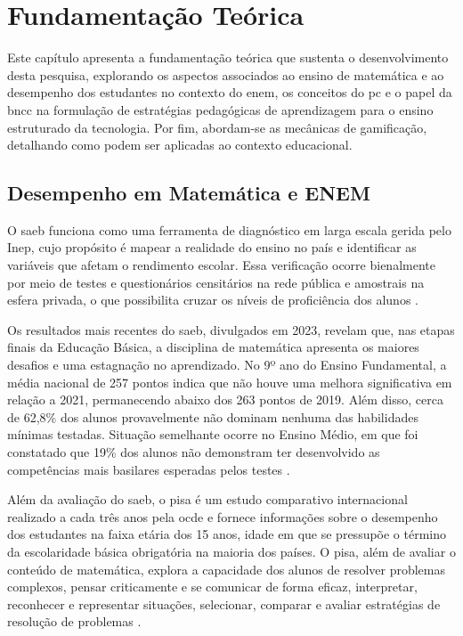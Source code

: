 
\setlength{\parskip}{0.3cm}

\chapter{Fundamentação Teórica}
\label{ch:fundamentacao}

Este capítulo apresenta a fundamentação teórica que sustenta o desenvolvimento
desta pesquisa, explorando os aspectos associados ao ensino de matemática e ao
desempenho dos estudantes no contexto do \gls{enem}, os conceitos do \gls{pc} e o papel da
\gls{bncc} na formulação de estratégias pedagógicas de aprendizagem para o
ensino estruturado da tecnologia. Por fim, abordam-se as mecânicas de
gamificação, detalhando como podem ser aplicadas ao contexto educacional.

\section{Desempenho em Matemática e ENEM}
O \gls{saeb} funciona como uma ferramenta de
diagnóstico em larga escala gerida pelo Inep, cujo propósito é mapear a
realidade do ensino no país e identificar as variáveis que afetam o rendimento
escolar. Essa verificação ocorre bienalmente por meio de testes e questionários
censitários na rede pública e amostrais na esfera privada, o que possibilita
cruzar os níveis de proficiência dos alunos \cite{brasil2026saeb}.

Os resultados mais recentes do \gls{saeb}, divulgados em 2023, revelam que, nas etapas
finais da Educação Básica, a disciplina de matemática apresenta os maiores desafios e
uma estagnação no aprendizado. No 9º ano do Ensino Fundamental, a média nacional
de 257 pontos indica que não houve uma melhora significativa em relação a 2021,
permanecendo abaixo dos 263 pontos de 2019. Além disso, cerca de 62,8\% dos alunos
provavelmente não dominam nenhuma das habilidades mínimas testadas. Situação
semelhante ocorre no Ensino Médio, em que foi constatado que 19\% dos alunos não demonstram
ter desenvolvido as competências mais basilares esperadas pelos testes \cite{brasil2026saeb}.

Além da avaliação do \gls{saeb}, o \gls{pisa} é um estudo comparativo internacional realizado a cada três anos pela
\gls{ocde} e fornece
informações sobre o desempenho dos estudantes na faixa etária dos 15 anos, idade
em que se pressupõe o término da escolaridade básica obrigatória na maioria dos
países. O \gls{pisa}, além de avaliar o conteúdo de matemática, explora a
capacidade dos alunos de resolver problemas complexos, pensar criticamente e se
comunicar de forma eficaz, interpretar, reconhecer e representar situações,
selecionar, comparar e avaliar estratégias de resolução de problemas
\cite{brasil2026pisa}.

